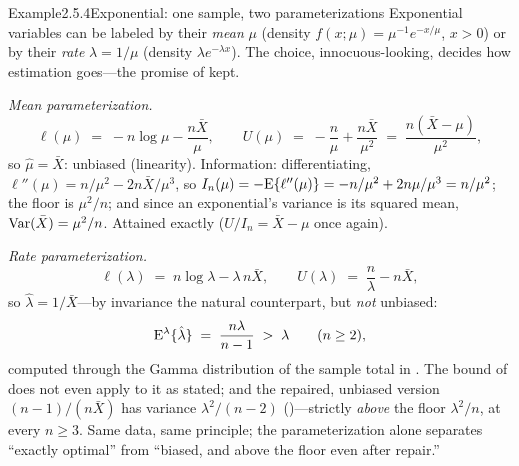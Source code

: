 \documentclass[main.tex]{subfiles}
\begin{document}
\begin{ObjL}{Example}{2.5.4}{Exponential: one sample, two parameterizations}
Exponential variables can be labeled by their \emph{mean} $\mu$ (density
$f(x;\mu)=\mu^{-1}e^{-x/\mu}$, $x>0$) or by their \emph{rate} $\lambda=1/\mu$ (density
$\lambda e^{-\lambda x}$). The choice, innocuous-looking, decides how estimation goes---the
promise of  kept.

\emph{Mean parameterization.}
\[ \ell(\mu) \;=\; -n\log\mu - \frac{n\bar X}{\mu} , \qquad
   U(\mu) \;=\; -\frac{n}{\mu} + \frac{n\bar X}{\mu^2}
   \;=\; \frac{n(\bar X-\mu)}{\mu^2} , \]
so $\hat\mu=\bar X$: unbiased (linearity). Information: differentiating,
$\ell''(\mu)=n/\mu^2-2n\bar X/\mu^3$, so
$I_n(\mu)=-\mathrm{E}\{\ell''(\mu)\}=-n/\mu^2+2n\mu/\mu^3=n/\mu^2$; the floor is $\mu^2/n$; and
since an exponential's variance is its squared mean, $\operatorname{Var}(\bar X)=\mu^2/n$. Attained
exactly ($U/I_n=\bar X-\mu$ once again).

\emph{Rate parameterization.}
\[ \ell(\lambda) \;=\; n\log\lambda - \lambda\, n\bar X , \qquad
   U(\lambda) \;=\; \frac{n}{\lambda} - n\bar X , \]
so $\hat\lambda=1/\bar X$---by invariance the natural counterpart, but \emph{not} unbiased:
\[ \mathrm{E}^{\lambda}\{\hat\lambda\} \;=\; \frac{n\lambda}{n-1} \;>\; \lambda
   \qquad (n\ge 2) , \]
computed through the Gamma distribution of the sample total in . The bound of
 does not even apply to it as stated; and the repaired, unbiased version
$(n-1)/(n\bar X)$ has variance $\lambda^2/(n-2)$ ()---strictly \emph{above}
the floor $\lambda^2/n$, at every $n\ge3$. Same data, same principle; the parameterization
alone separates ``exactly optimal'' from ``biased, and above the floor even after repair.''
\end{ObjL}
\end{document}
